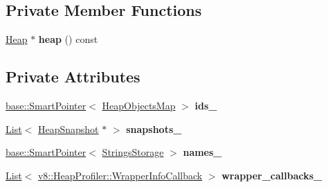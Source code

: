 \subsection*{Private Member Functions}
\begin{DoxyCompactItemize}
\item 
\hyperlink{classv8_1_1internal_1_1_heap}{Heap} $\ast$ {\bfseries heap} () const \hypertarget{classv8_1_1internal_1_1_heap_profiler_aa4f43af9c66823b9a1148eb2c4b0a36a}{}\label{classv8_1_1internal_1_1_heap_profiler_aa4f43af9c66823b9a1148eb2c4b0a36a}

\end{DoxyCompactItemize}
\subsection*{Private Attributes}
\begin{DoxyCompactItemize}
\item 
\hyperlink{classv8_1_1base_1_1_smart_pointer}{base\+::\+Smart\+Pointer}$<$ \hyperlink{classv8_1_1internal_1_1_heap_objects_map}{Heap\+Objects\+Map} $>$ {\bfseries ids\+\_\+}\hypertarget{classv8_1_1internal_1_1_heap_profiler_a3894c7f4e2f6c5dd6dd7513a5e1582d9}{}\label{classv8_1_1internal_1_1_heap_profiler_a3894c7f4e2f6c5dd6dd7513a5e1582d9}

\item 
\hyperlink{classv8_1_1internal_1_1_list}{List}$<$ \hyperlink{classv8_1_1internal_1_1_heap_snapshot}{Heap\+Snapshot} $\ast$ $>$ {\bfseries snapshots\+\_\+}\hypertarget{classv8_1_1internal_1_1_heap_profiler_af7fab2e66e29dfba97b37d76b04afee3}{}\label{classv8_1_1internal_1_1_heap_profiler_af7fab2e66e29dfba97b37d76b04afee3}

\item 
\hyperlink{classv8_1_1base_1_1_smart_pointer}{base\+::\+Smart\+Pointer}$<$ \hyperlink{classv8_1_1internal_1_1_strings_storage}{Strings\+Storage} $>$ {\bfseries names\+\_\+}\hypertarget{classv8_1_1internal_1_1_heap_profiler_a9e92cda7d850f08065c577e6f8853406}{}\label{classv8_1_1internal_1_1_heap_profiler_a9e92cda7d850f08065c577e6f8853406}

\item 
\hyperlink{classv8_1_1internal_1_1_list}{List}$<$ \hyperlink{classv8_1_1_heap_profiler_a677025dd201fd832e0464e5ab0b0d0d4}{v8\+::\+Heap\+Profiler\+::\+Wrapper\+Info\+Callback} $>$ {\bfseries wrapper\+\_\+callbacks\+\_\+}\hypertarget{classv8_1_1internal_1_1_heap_profiler_a31c93ddfda90559fae622859ff71d151}{}\label{classv8_1_1internal_1_1_heap_profiler_a31c93ddfda90559fae622859ff71d151}


\end{DoxyCompactItemize}
